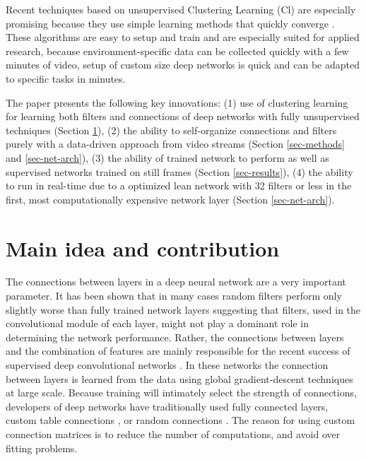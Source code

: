 \documentclass{article} %
\begin{document}
Recent techniques based on unsupervised Clustering Learning (Cl) are especially promising because they use simple learning methods that quickly converge \cite{culurciello2013clustering,coates_analysis_2011}. 
These algorithms are easy to setup and train and are especially suited for applied research, because environment-specific data can be collected quickly with a few minutes of video, setup of custom size deep networks is quick and can be adapted to specific tasks in minutes.


The paper presents the following key innovations: (1) use of clustering learning for learning both filters and connections of deep networks with fully unsupervised techniques (Section \ref{sec-main}), (2) the ability to self-organize connections and filters purely with a data-driven approach from video streams (Section \ref{sec-methods} and  \ref{sec-net-arch}), (3) the ability of trained network to perform as well as supervised networks trained on still frames (Section \ref{sec-results}), (4) the ability to run in real-time due to a optimized lean network with 32 filters or less in the first, most computationally expensive network layer (Section \ref{sec-net-arch}). 



\section{Main idea and contribution}
\label{sec-main}

The connections between layers in a deep neural network are a very important parameter. It has been shown that in many cases random filters perform only slightly worse than fully trained network layers \cite{saxe2011random} suggesting that filters, used in the convolutional module of each layer, might not play a dominant role in determining the network performance.
Rather, the connections between layers and the combination of features are mainly responsible for the recent success of supervised deep convolutional networks \cite{krizhevsky_imagenet_2012}. In these networks the connection between layers is learned from the data using global gradient-descent techniques at large scale. Because training will intimately select the strength of connections, developers of deep networks have traditionally used fully connected layers, custom table connections \cite{lecun_gradient-based_1998}, or random connections \cite{lecun_convolutional_2010}. The reason for using custom connection matrices is to reduce the number of computations, and avoid over fitting problems.
 
\end{document}
